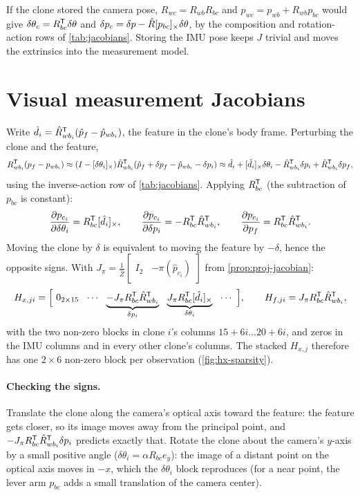 If the clone stored the camera pose, $R_{wc} = R_{wb}R_{bc}$ and $p_{wc} = p_{wb} + R_{wb}p_{bc}$ would give
$\delta\theta_c = R_{bc}^{\mathsf{T}}\delta\theta$ and $\delta p_c = \delta p - \hat R[p_{bc}]_{\times}\delta\theta$, by the composition and rotation-action rows of \cref{tab:jacobians}. Storing the
IMU pose keeps $J$ trivial and moves the extrinsics into the measurement model.

\section{Visual measurement Jacobians}
\label{sol:Hcam}

Write $\hat d_i = \hat R_{wb_i}^{\mathsf{T}}(\hat p_f - \hat p_{wb_i})$, the feature in the clone's body frame. Perturbing the clone and the feature,
\begin{equation*}
  R_{wb_i}^{\mathsf{T}}(p_f - p_{wb_i}) \approx (I - [\delta\theta_i]_{\times})\hat R_{wb_i}^{\mathsf{T}}(\hat p_f + \delta p_f - \hat p_{wb_i} - \delta p_i)
  \approx \hat d_i + [\hat d_i]_{\times}\delta\theta_i - \hat R_{wb_i}^{\mathsf{T}}\delta p_i + \hat R_{wb_i}^{\mathsf{T}}\delta p_f ,
\end{equation*}
using the inverse-action row of \cref{tab:jacobians}. Applying $R_{bc}^{\mathsf{T}}$ (the subtraction of $p_{bc}$ is constant):
\begin{equation}
  \frac{\partial p_{c_i}}{\partial\delta\theta_i} = R_{bc}^{\mathsf{T}}[\hat d_i]_{\times}, \qquad
  \frac{\partial p_{c_i}}{\partial\delta p_i} = -R_{bc}^{\mathsf{T}}\hat R_{wb_i}^{\mathsf{T}}, \qquad
  \frac{\partial p_{c_i}}{\partial p_f} = R_{bc}^{\mathsf{T}}\hat R_{wb_i}^{\mathsf{T}} .
\end{equation}
Moving the clone by $\delta$ is equivalent to moving the feature by $-\delta$, hence the opposite signs. With
$J_\pi = \frac1{\hat Z}\begin{bmatrix} I_2 & -\pi(\hat p_{c_i})\end{bmatrix}$ from \cref{prop:proj-jacobian}:
\begin{equation}
  H_{x,ji} = \Big[\ 0_{2\times15}\ \ \cdots\ \ \underbrace{-J_\pi R_{bc}\T\hat R_{wb_i}\T}_{\delta p_i}\ \ \underbrace{J_\pi R_{bc}\T\sx{\hat d_i}}_{\delta\theta_i}\ \ \cdots\ \Big],
  \qquad
  H_{f,ji} = J_\pi R_{bc}\T\hat R_{wb_i}\T ,
\end{equation}
with the two non-zero blocks in clone $i$'s columns $15 + 6i \dots 20 + 6i$, and zeros in the IMU columns and in every other clone's columns.
The stacked $H_{x,j}$ therefore has one $2\times6$ non-zero block per observation (\cref{fig:hx-sparsity}).

\paragraph{Checking the signs.} Translate the clone along the camera's optical axis toward the feature: the feature gets closer, so its
image moves away from the principal point, and $-J_\pi R_{bc}^{\mathsf{T}}\hat R_{wb_i}^{\mathsf{T}}\delta p_i$ predicts exactly that. Rotate the clone about the camera's
$y$-axis by a small positive angle ($\delta\theta_i = \alpha R_{bc}e_y$): the image of a distant point on the optical axis moves in $-x$, which the
$\delta\theta_i$ block reproduces (for a near point, the lever arm $p_{bc}$ adds a small translation of the camera center).
